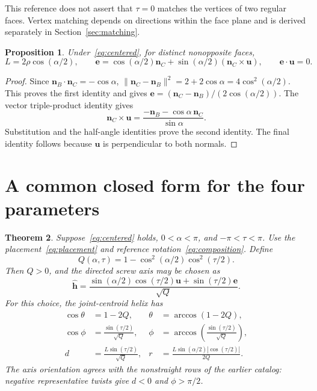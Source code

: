\documentclass[11pt]{article}
\newtheorem{theorem}{Theorem}[section]
\newtheorem{proposition}[theorem]{Proposition}
\theoremstyle{definition}
\newcommand{\nb}{\mathbf n_B}
\newcommand{\nc}{\mathbf n_C}
\newcommand{\ee}{\mathbf e}
\newcommand{\uu}{\mathbf u}
\newcommand{\hh}{\widehat{\mathbf h}}
\begin{document}
This reference does not assert that $\tau=0$ matches the vertices of two
regular faces. Vertex matching depends on directions within the face plane
and is derived separately in Section~\ref{sec:matching}.

\begin{proposition}\label{prop:geometry}
Under~\eqref{eq:centered}, for distinct nonopposite faces,
\begin{equation}\label{eq:Lrho}
 L=2\rho\cos(\alpha/2),
 \qquad
 \ee=\cos(\alpha/2)\nc+
       \sin(\alpha/2)(\nc\times\uu),
 \qquad \ee\cdot\uu=0.
\end{equation}
\end{proposition}
\begin{proof}
Since $\nb\cdot\nc=-\cos\alpha$,
$\|\nc-\nb\|^2=2+2\cos\alpha=4\cos^2(\alpha/2)$.
This proves the first identity and gives
$\ee=(\nc-\nb)/(2\cos(\alpha/2))$. The vector triple-product identity gives
\[
 \nc\times\uu=
 \frac{-\nb-\cos\alpha\,\nc}{\sin\alpha}.
\]
Substitution and the half-angle identities prove the second identity.
The final identity follows because $\uu$ is perpendicular to both normals.
\end{proof}

\section{A common closed form for the four parameters}\label{sec:theorem}
\begin{theorem}\label{thm:main}
Suppose~\eqref{eq:centered} holds, $0<\alpha<\pi$, and
$-\pi<\tau<\pi$. Use the placement~\eqref{eq:placement} and reference
rotation~\eqref{eq:composition}. Define
\begin{equation}\label{eq:Q}
 Q(\alpha,\tau)=1-\cos^2(\alpha/2)\cos^2(\tau/2).
\end{equation}
Then $Q>0$, and the directed screw axis may be chosen as
\begin{equation}\label{eq:axis}
 \hh=\frac{\sin(\alpha/2)\cos(\tau/2)\uu+
                  \sin(\tau/2)\ee}{\sqrt Q}.
\end{equation}
For this choice, the joint-centroid helix has
\begin{equation}\label{eq:main}
 \boxed{\begin{aligned}
 \cos\theta&=1-2Q,
 &\theta&=\arccos(1-2Q),\\[2pt]
 \cos\phi&=\frac{\sin(\tau/2)}{\sqrt Q},
 &\phi&=\arccos\!\left(\frac{\sin(\tau/2)}{\sqrt Q}\right),\\[2pt]
 d&=\frac{L\sin(\tau/2)}{\sqrt Q},
 &r&=\frac{L\sin(\alpha/2)|\cos(\tau/2)|}{2Q}.
 \end{aligned}}
\end{equation}
The axis orientation agrees with the nonstraight rows of the earlier catalog:
negative representative twists give $d<0$ and $\phi>\pi/2$.
\end{theorem}
\end{document}
